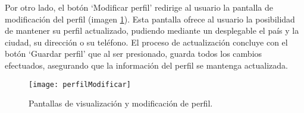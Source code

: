 Por otro lado, el botón `Modificar perfil' redirige al usuario la pantalla de modificación del perfil (imagen \ref{fig:perfilModificar}).
Esta pantalla ofrece al usuario la posibilidad de mantener su perfil actualizado, pudiendo mediante un desplegable el país y la ciudad, su dirección o su teléfono.
El proceso de actualización concluye con el botón `Guardar perfil' que al ser presionado, guarda todos los cambios efectuados, asegurando que la información del perfil se mantenga actualizada.


\begin{figure}[h]
	\centering
	\texttt{[image: perfilModificar]}
	\caption[Pantallas perfil y modificación perfil]{Pantallas de visualización y modificación de perfil.}
	\label{fig:perfilModificar}
\end{figure}



